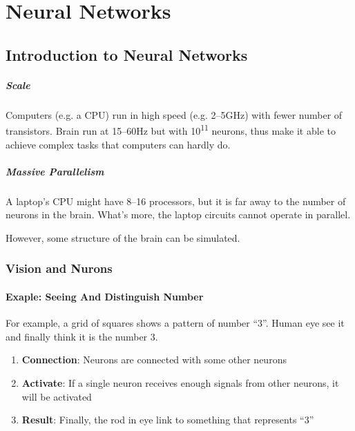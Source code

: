\documentclass[a4paper, openany]{book}
\begin{document}
\chapter{Neural Networks}

\section{Introduction to Neural Networks}

\paragraph{Scale}

Computers (e.g. a CPU) run in high speed (e.g. 2--5GHz) with fewer number of transistors. Brain run at 15--60Hz but with 10\textsuperscript{11} neurons, thus make it able to achieve complex tasks that computers can hardly do.

\paragraph{Massive Parallelism}

A laptop's CPU might have 8--16 processors, but it is far away to the number of neurons in the brain. What's more, the laptop circuits cannot operate in parallel.

However, some structure of the brain can be simulated.

\subsection{Vision and Nurons}

\subsubsection{Exaple: Seeing And Distinguish Number}

For example, a grid of squares shows a pattern of number ``3''. Human eye see it and finally think it is the number 3.

\begin{enumerate}
  \item \textbf{Connection}: Neurons are connected with some other neurons
  \item \textbf{Activate}: If a single neuron receives enough signals from other neurons, it will be activated
  \item \textbf{Result}: Finally, the rod in eye link to something that represents ``3''
\end{enumerate}
\end{document}
